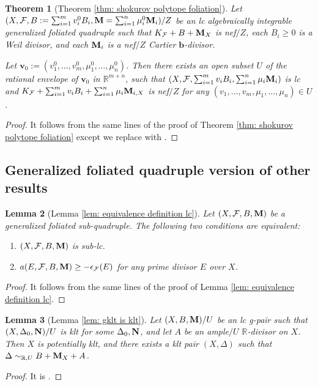 \documentclass[11pt]{amsart}
\numberwithin{equation}{section}
\newcommand{\bb}{\bm{b}}
\newcommand{\Mm}{{\bf{M}}}
\newcommand{\Nn}{{\bf{N}}}
\newcommand{\Rr}{\mathbb{R}}
\newcommand{\Ff}{\mathcal{F}}
\newtheorem{thm}{Theorem}[section]
\newtheorem{lem}[thm]{Lemma}
\theoremstyle{definition}
\theoremstyle{definition}
\theoremstyle{definition}
\begin{document}
\begin{thm}[Theorem \ref{thm: shokurov polytope foliation}]\label{thm: shokurov polytope foliation gfq}
    Let $(X,\Ff,B:=\sum_{i=1}^mv^0_iB_i,\Mm=\sum_{i=1}^n\mu^0_i\Mm_i)/Z$ be an lc algebraically integrable generalized foliated quadruple such that $K_{\Ff}+B+\Mm_X$ is nef$/Z$, each $B_i\geq 0$ is a Weil divisor, and each $\Mm_i$ is a nef$/Z$ Cartier $\bb$-divisor.
    
    Let $\bm{v}_0:=(v^0_1,\dots,v^0_m,\mu^0_1,\dots,\mu^0_n)$. Then there exists an open subset $U$ of the rational envelope of $\bm{v}_0$ in $\mathbb R^{m+n}$, such that $(X,\Ff,\sum_{i=1}^mv_iB_i,\sum_{i=1}^{n}\mu_i\Mm_i)$ is lc and $K_{\Ff}+\sum_{i=1}^mv_iB_i+\sum_{i=1}^{n}\mu_i\Mm_{i,X}$ is nef$/Z$ for any $(v_1,\dots,v_m,\mu_1,\dots,\mu_n)\in U$.
\end{thm}
\begin{proof}
    It follows from the same lines of the proof of Theorem \ref{thm: shokurov polytope foliation} except we replace \cite[Theorem 1.5]{DLM23} with \cite[Theorem 2.4.7]{CHLX23}.
\end{proof}

\subsection{Generalized foliated quadruple version of other results}

\begin{lem}[Lemma \ref{lem: equivalence definition lc}]\label{lem: equivalence definition lc gfq}
    Let $(X,\Ff,B,\Mm)$ be a generalized foliated sub-quadruple. The following two conditions are equivalent:
    \begin{enumerate}
        \item $(X,\Ff,B,\Mm)$ is sub-lc.
        \item $a(E,\Ff,B,\Mm)\geq -\epsilon_{\Ff}(E)$ for any prime divisor $E$ over $X$.
    \end{enumerate}
\end{lem}
\begin{proof}
It follows from the same lines of the proof of Lemma \ref{lem: equivalence definition lc}.
\end{proof}

\begin{lem}[Lemma \ref{lem: gklt is klt}]\label{lem: gklt is klt gfq}
    Let $(X,B,\Mm)/U$ be an lc g-pair such that $(X,\Delta_0,\Nn)/U$ is klt for some $\Delta_0,\Nn$, and let $A$ be an ample$/U$ $\Rr$-divisor on $X$. Then $X$ is potentially klt, and there exists a klt pair $(X,\Delta)$ such that $\Delta\sim_{\mathbb R,U}B+\Mm_X+A$.
\end{lem}
\begin{proof}
    It is \cite[Lemma 3.4]{HL22}.
\end{proof}
\end{document}
